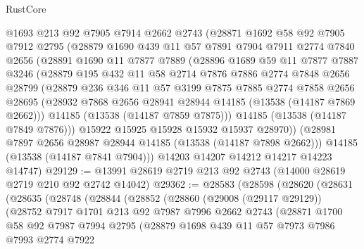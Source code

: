 \begin{lexlean}{RustCore}
\begin{coremodule}
    @1693
    @213
    @92
    @7905
    @7914
    @2662
    @2743
    (@28871
      @1692
      @58
      @92
      @7905
      @7912
      @2795
      (@28879
        @1690
        @439
        @11
        @57
        @7891
        @7904
        @7911
        @2774
        @7840
        @2656
        (@28891
          @1690
          @11
          @7877
          @7889
          (@28896
            @1689
            @59
            @11
            @7877
            @7887
            @3246
            (@28879
              @195
              @432
              @11
              @58
              @2714
              @7876
              @7886
              @2774
              @7848
              @2656
              @28799
              (@28879
                @236
                @346
                @11
                @57
                @3199
                @7875
                @7885
                @2774
                @7858
                @2656
                @28695
                (@28932 @7868 @2656 @28941 @28944 @14185 (@13538 (@14187 @7869 @2662)))
                @14185
                (@13538 (@14187 @7859 @7875)))
              @14185
              (@13538 (@14187 @7849 @7876)))
            @15922
            @15925
            @15928
            @15932
            @15937
            @28970))
        (@28981 @7897 @2656 @28987 @28944 @14185 (@13538 (@14187 @7898 @2662)))
        @14185
        (@13538 (@14187 @7841 @7904)))
      @14203
      @14207
      @14212
      @14217
      @14223
      @14747)
@29129 := @13991 @28619 @2719 @213 @92 @2743 (@14000 @28619 @2719 @210 @92 @2742 @14042)
@29362 := @28583
    (@28598
      (@28620
        (@28631
          (@28635
            (@28748
              (@28844
                (@28852
                  (@28860
                    (@29008 (@29117 @29129))
                    (@28752
                      @7917
                      @1701
                      @213
                      @92
                      @7987
                      @7996
                      @2662
                      @2743
                      (@28871
                        @1700
                        @58
                        @92
                        @7987
                        @7994
                        @2795
                        (@28879
                          @1698
                          @439
                          @11
                          @57
                          @7973
                          @7986
                          @7993
                          @2774
                          @7922

\end{coremodule}
\end{lexlean}
